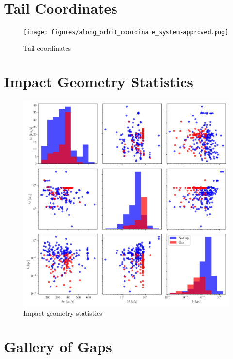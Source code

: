\documentclass[draft]{aa}
\begin{document}
\begin{appendix}

  \section{Tail Coordinates} \label{appendix:TailCoordinates}

  \begin{figure}
    \centering
    \texttt{[image: figures/along\_orbit\_coordinate\_system-approved.png]}
    \caption{Tail coordinates}
    \label{fig:TailCoordinates}
  \end{figure}

  \section{Impact Geometry Statistics}

  \begin{figure}
    \centering
    \includegraphics[width=\linewidth]{impact_geometry_statistics.png}
    \caption{Impact geometry statistics}
    \label{fig:impact_geometry_statistics}    
    \end{figure}


  \section{Gallery of Gaps} \label{appendix:gallery_of_gaps}


\end{appendix}
\end{document}
